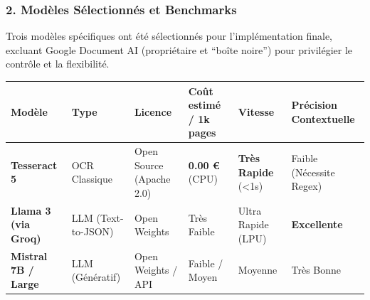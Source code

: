 \documentclass[
  letterpaper,
  DIV=11,
  numbers=noendperiod]{scrartcl}
\begin{document}
\subsubsection{2. Modèles Sélectionnés et
Benchmarks}\label{moduxe8les-suxe9lectionnuxe9s-et-benchmarks}

Trois modèles spécifiques ont été sélectionnés pour l'implémentation
finale, excluant Google Document AI (propriétaire et ``boîte noire'')
pour privilégier le contrôle et la flexibilité.

\begin{longtable}[]{@{}
  >{\raggedright\arraybackslash}p{}
  >{\raggedright\arraybackslash}p{}
  >{\raggedright\arraybackslash}p{}
  >{\raggedright\arraybackslash}p{}
  >{\raggedright\arraybackslash}p{}
  >{\raggedright\arraybackslash}p{}@{}}
\toprule\noalign{}
\begin{minipage}[b]{\linewidth}\raggedright
Modèle
\end{minipage} & \begin{minipage}[b]{\linewidth}\raggedright
Type
\end{minipage} & \begin{minipage}[b]{\linewidth}\raggedright
Licence
\end{minipage} & \begin{minipage}[b]{\linewidth}\raggedright
Coût estimé / 1k pages
\end{minipage} & \begin{minipage}[b]{\linewidth}\raggedright
Vitesse
\end{minipage} & \begin{minipage}[b]{\linewidth}\raggedright
Précision Contextuelle
\end{minipage} \\
\midrule\noalign{}
\endhead
\bottomrule\noalign{}
\endlastfoot
\textbf{Tesseract 5} & OCR Classique & Open Source (Apache 2.0) &
\textbf{0.00 €} (CPU) & \textbf{Très Rapide} (\textless1s) & Faible
(Nécessite Regex) \\
\textbf{Llama 3 (via Groq)} & LLM (Text-to-JSON) & Open Weights & Très
Faible & Ultra Rapide (LPU) & \textbf{Excellente} \\
\textbf{Mistral 7B / Large} & LLM (Génératif) & Open Weights / API &
Faible / Moyen & Moyenne & Très Bonne \\
\end{longtable}
\end{document}
